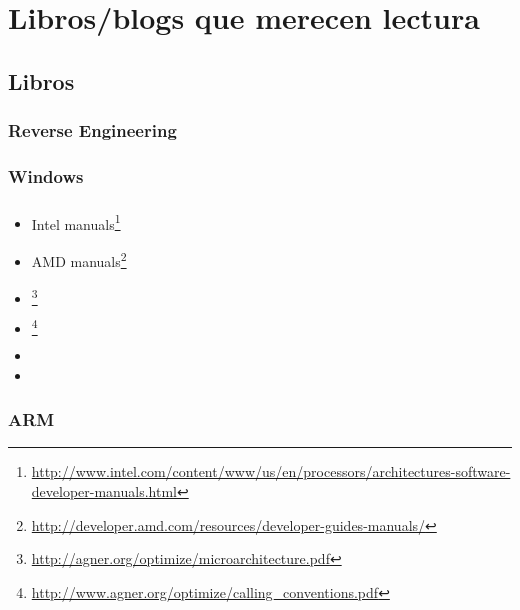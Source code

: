 \chapter{Libros/blogs que merecen lectura}

\section{Libros}

\subsection{Reverse Engineering}



\subsection{Windows}



\subsection{\CCpp}



\label{x86_manuals}
\begin{itemize}
\item Intel manuals\footnote{\AlsoAvailableAs \url{http://www.intel.com/content/www/us/en/processors/architectures-software-developer-manuals.html}}

\item AMD manuals\footnote{\AlsoAvailableAs \url{http://developer.amd.com/resources/developer-guides-manuals/}}

\item \AgnerFog{}\footnote{\AlsoAvailableAs \url{http://agner.org/optimize/microarchitecture.pdf}}

\item \AgnerFogCC{}\footnote{\AlsoAvailableAs \url{http://www.agner.org/optimize/calling_conventions.pdf}}

\item \IntelOptimization

\item \AMDOptimization
\end{itemize}

\subsection{ARM}

